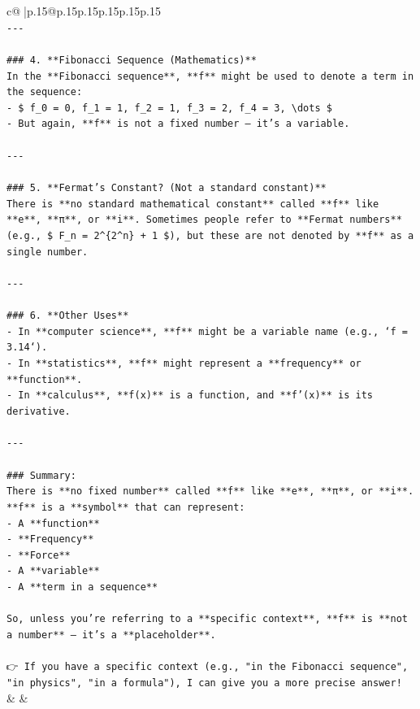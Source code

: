 \documentclass{article}
\begin{document}
{\begin{supertabular}{c@{$\;$}|p{.15\linewidth}@{}p{.15\linewidth}p{.15\linewidth}p{.15\linewidth}p{.15\linewidth}p{.15\linewidth}}
{{{\\ 
\texttt{{-}{-}{-}} \\
\\ 
\texttt{\#\#\# 4. **Fibonacci Sequence (Mathematics)**} \\
\texttt{In the **Fibonacci sequence**, **f** might be used to denote a term in the sequence:} \\
\texttt{{-} \$ f\_0 = 0, f\_1 = 1, f\_2 = 1, f\_3 = 2, f\_4 = 3, \textbackslash{}dots \$} \\
\texttt{{-} But again, **f** is not a fixed number — it's a variable.} \\
\\ 
\texttt{{-}{-}{-}} \\
\\ 
\texttt{\#\#\# 5. **Fermat's Constant? (Not a standard constant)**} \\
\texttt{There is **no standard mathematical constant** called **f** like **e**, **π**, or **i**. Sometimes people refer to **Fermat numbers** (e.g., \$ F\_n = 2\^{}\{2\^{}n\} + 1 \$), but these are not denoted by **f** as a single number.} \\
\\ 
\texttt{{-}{-}{-}} \\
\\ 
\texttt{\#\#\# 6. **Other Uses**} \\
\texttt{{-} In **computer science**, **f** might be a variable name (e.g., `f = 3.14`).} \\
\texttt{{-} In **statistics**, **f** might represent a **frequency** or **function**.} \\
\texttt{{-} In **calculus**, **f(x)** is a function, and **f'(x)** is its derivative.} \\
\\ 
\texttt{{-}{-}{-}} \\
\\ 
\texttt{\#\#\# Summary:} \\
\texttt{There is **no fixed number** called **f** like **e**, **π**, or **i**.  } \\
\texttt{**f** is a **symbol** that can represent:} \\
\texttt{{-} A **function**} \\
\texttt{{-} **Frequency**} \\
\texttt{{-} **Force**} \\
\texttt{{-} A **variable**} \\
\texttt{{-} A **term in a sequence**} \\
\\ 
\texttt{So, unless you're referring to a **specific context**, **f** is **not a number** — it's a **placeholder**.} \\
\\ 
\texttt{👉 If you have a specific context (e.g., "in the Fibonacci sequence", "in physics", "in a formula"), I can give you a more precise answer!} \\
            }
        }
    }
    & & \\ \\


\end{supertabular}}
\end{document}
